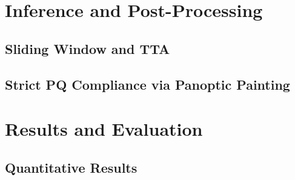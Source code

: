 \documentclass[conference]{IEEEtran}
\begin{document}
\section{Inference and Post-Processing}
\subsection{Sliding Window and TTA}

\subsection{Strict PQ Compliance via Panoptic Painting}

\section{Results and Evaluation}
\subsection{Quantitative Results}
\end{document}

